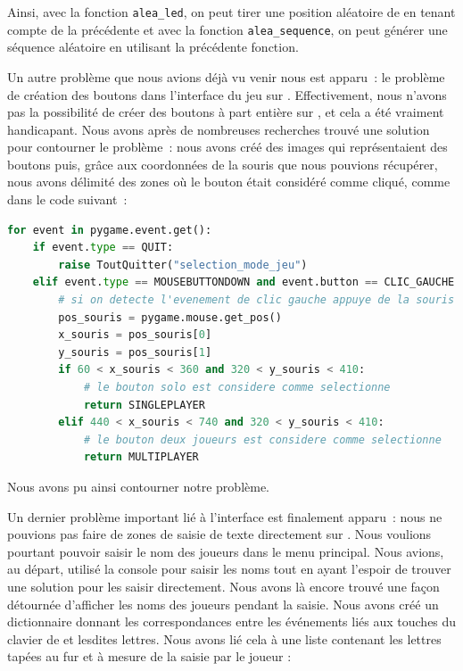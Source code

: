 \documentclass[a4paper, 11pt]{article}
\newcommand{\py}{\sf{Python}}
\newcommand{\pygame}{\sf{Pygame}}
\newcommand{\led}{\sc{led}}
\begin{document}
Ainsi, avec la fonction \verb=alea_led=, on peut tirer une position aléatoire de \led{} en tenant compte de la précédente et avec la fonction \verb=alea_sequence=, on peut générer une séquence aléatoire en utilisant la précédente fonction.

Un autre problème que nous avions déjà vu venir nous est apparu : le problème de création des boutons dans l'interface du jeu sur \pygame{}. Effectivement, nous n'avons pas la possibilité de créer des boutons à part entière sur \pygame{}, et cela a été vraiment handicapant. Nous avons après de nombreuses recherches trouvé une solution pour contourner le problème : nous avons créé des images qui représentaient des boutons puis, grâce aux coordonnées de la souris que nous pouvions récupérer, nous avons délimité des zones où le bouton était considéré comme cliqué, comme dans le code suivant~:

\begin{lstlisting}[language=Python, float=H, caption=Faux boutons sur \pygame{}]
for event in pygame.event.get():
    if event.type == QUIT:
        raise ToutQuitter("selection_mode_jeu")
    elif event.type == MOUSEBUTTONDOWN and event.button == CLIC_GAUCHE:
        # si on detecte l'evenement de clic gauche appuye de la souris
        pos_souris = pygame.mouse.get_pos()
        x_souris = pos_souris[0]
        y_souris = pos_souris[1]
        if 60 < x_souris < 360 and 320 < y_souris < 410:
            # le bouton solo est considere comme selectionne
            return SINGLEPLAYER
        elif 440 < x_souris < 740 and 320 < y_souris < 410:
            # le bouton deux joueurs est considere comme selectionne
            return MULTIPLAYER
\end{lstlisting}

Nous avons pu ainsi contourner notre problème.

Un dernier problème important lié à l'interface est finalement apparu : nous ne pouvions pas faire de zones de saisie de texte directement sur \pygame{}. Nous voulions pourtant pouvoir saisir le nom des joueurs dans le menu principal. Nous avions, au départ, utilisé la console \py{} pour saisir les noms tout en ayant l'espoir de trouver une solution pour les saisir directement. Nous avons là encore trouvé une façon détournée d'afficher les noms des joueurs pendant la saisie. Nous avons créé un dictionnaire donnant les correspondances entre les événements liés aux touches du clavier de \pygame{} et lesdites lettres. Nous avons lié cela à une liste contenant les lettres tapées au fur et à mesure de la saisie par le joueur :
\end{document}
